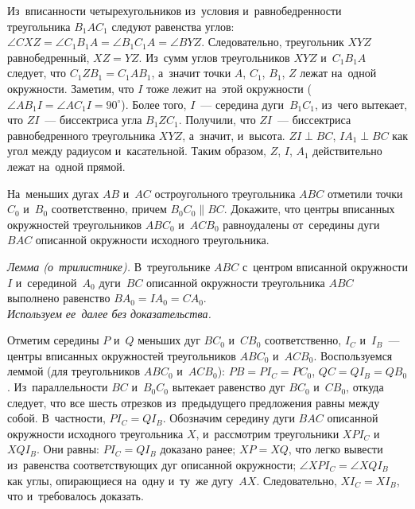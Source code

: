 \ifincludesolutions
Из~вписанности четырехугольников из~условия и~равнобедренности треугольника
$B_1 A C_1$ следуют равенства углов:
$\angle CXZ = \angle C_1 B_1 A = \angle B_1 C_1 A = \angle BYZ$.
Следовательно, треугольник $XYZ$ равнобедренный, $XZ = YZ$.
Из~сумм углов треугольников $XYZ$ и~$C_1 B_1 A$ следует, что
$C_1 Z B_1 = C_1 A B_1$, а~значит точки $A$, $C_1$, $B_1$, $Z$ лежат на~одной
окружности.
Заметим, что $I$ тоже лежит на~этой окружности
($\angle A B_1 I = \angle A C_1 I = 90^{\circ}$).
Более того, $I$~— середина дуги~$B_1 C_1$, из~чего вытекает,
что $ZI$~— биссектриса угла $B_1 Z C_1$.
Получили, что $ZI$~— биссектриса равнобедренного треугольника $XYZ$,
а~значит, и~высота.
$ZI \perp BC$, $I A_1 \perp BC$ как угол между радиусом и~касательной.
Таким образом, $Z$, $I$, $A_1$ действительно лежат на~одной прямой.
\fi %

\begin{problems}

\item
На~меньших дугах $AB$ и~$AC$ остроугольного треугольника $ABC$ отметили
точки $C_0$ и~$B_0$ соответственно, причем $B_0 C_0 \parallel BC$.
Докажите, что центры вписанных окружностей треугольников $A B C_0$ и~$A C B_0$
равноудалены от~середины дуги $BAC$ описанной окружности исходного
треугольника.

\end{problems}

\ifincludesolutions
\emph{Лемма (о~трилистнике).}
В~треугольнике $ABC$ с~центром вписанной окружности $I$ и~серединой~$A_0$
дуги~$BC$ описанной окружности треугольника $ABC$ выполнено равенство
$B A_0 = I A_0 = C A_0$.
\\
\emph{Используем ее~далее без доказательства.}
\par
Отметим середины $P$ и~$Q$ меньших дуг $B C_0$ и~$C B_0$ соответственно,
$I_C$ и~$I_B$~— центры вписанных окружностей треугольников
$A B C_0$ и~$A C B_0$.
Воспользуемся леммой (для треугольников $A B C_0$ и~$A C B_0$):
$P B = P I_C = P C_0$, $Q C = Q I_B = Q B_0$.
Из~параллельности $BC$ и~$B_0 C_0$ вытекает равенство дуг $B C_0$ и~$C B_0$,
откуда следует, что все шесть отрезков из~предыдущего предложения равны между
собой.
В~частности, $P I_C = Q I_B$.
Обозначим середину дуги $BAC$ описанной окружности исходного треугольника $X$,
и~рассмотрим треугольники $X P I_C$ и~$X Q I_B$.
Они равны: $P I_C = Q I_B$ доказано ранее; $XP = XQ$, что легко вывести
из~равенства соответствующих дуг описанной окружности;
$\angle X P I_C = \angle X Q I_B$ как углы, опирающиеся на~одну и~ту~же
дугу~$AX$.
Следовательно, $X I_C = X I_B$, что и~требовалось доказать.
\fi %

